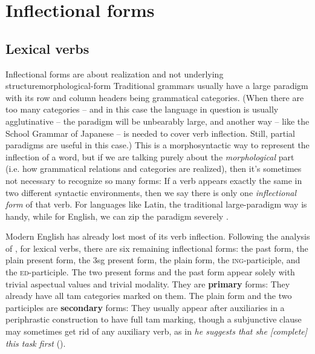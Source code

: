 \documentclass[UTF8, a4paper, oneside, scheme=plain]{ctexrep}
\newcommand*{\citesec}[1]{\S~{#1}}
\newcommand*{\citechap}[1]{Ch~{#1}}
\newcommand*{\citechapsec}[2]{\citechap{#1}.\citesec{#2}}
\newcommand*{\concept}[1]{\textbf{#1}}
\newcommand{\corpus}[1]{\emph{#1}}
\newcommand{\corpuscat}[1]{\textsc{#1}}
\begin{document}
\section{Inflectional forms}\label{sec:verb-forms}

\subsection{Lexical verbs}

\begin{theorybox}{Inflectional forms are about realization and not underlying structure}{morphological-form}
    Traditional grammars usually have a large paradigm
    with its row and column headers being grammatical categories.
    (When there are too many categories 
    -- and in this case the language in question is usually agglutinative -- 
    the paradigm will be unbearably large, 
    and another way -- like the School Grammar of Japanese -- is needed to cover verb inflection.
    Still, partial paradigms are useful in this case.) 
    This is a morphosyntactic way to represent the inflection of a word, 
    but if we are talking purely about the \emph{morphological} part
    (i.e. how grammatical relations and categories are realized),
    then it's sometimes not necessary to recognize so many forms:
    If a verb appears exactly the same in two different syntactic environments,
    then we say there is only one \emph{inflectional form} of that verb.
    For languages like Latin, 
    the traditional large-paradigm way is handy,
    while for English, we can zip the paradigm severely \citep[\citechapsec{3}{1.2}]{cgel}.
\end{theorybox}

Modern English has already lost most of its verb inflection.
Following the analysis of \citet[\citechapsec{3}{1.1}]{cgel},
for lexical verbs,
there are six remaining inflectional forms: 
the past form, the plain present form, 
the 3sg present form,
the plain form, the \corpuscat{ing}-participle,
and the \corpuscat{ed}-participle.
The two present forms and the past form appear solely 
with trivial aspectual values and trivial modality.
They are \concept{primary} forms:
They already have all \acs{tam} categories marked on them.
The plain form and the two participles are \concept{secondary} forms:
They usually appear after auxiliaries 
in a periphrastic construction to have full \acs{tam} marking,
though a subjunctive clause may sometimes get rid of any auxiliary verb,
as in \corpus{he suggests that she [complete] this task first} ().
\end{document}
